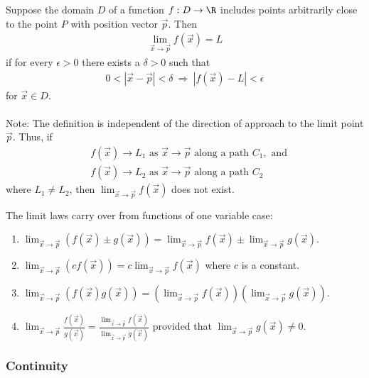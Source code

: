 \documentclass{article}
\begin{document}
\begin{definition}
	Suppose the domain $D$ of a function $f:D\to\R$ includes points
	arbitrarily close to the point $P$ with position vector $\vec p$.
	Then
	\begin{align*}
		\lim_{\vec x\to \vec p}f(\vec x)=L
	\end{align*}
	if for every $\epsilon>0$ there exists a $\delta > 0$ such that
	\begin{align*}
		0 < |\vec x - \vec p| < \delta \:\Rightarrow\: |f(\vec x)-L|<\epsilon
	\end{align*}
	for $\vec x \in D$.\\\\
	Note: The definition is independent of the direction of approach to the
	limit point $\vec p$. Thus, if
	\begin{align*}
		 & f(\vec x)\to L_1 \text{ as } \vec x\to\vec p \text{ along a path } C_1, \text{ and} \\
		 & f(\vec x)\to L_2 \text{ as } \vec x\to\vec p \text{ along a path } C_2
	\end{align*}
	where $L_1 \not= L_2$, then $\lim_{\vec x\to\vec p} f(\vec x)$ does not exist.
\end{definition}
\begin{theorem}
	The limit laws carry over from functions of one variable case:
	\begin{enumerate}
		\item $\lim_{\vec x\to\vec p}\left(f(\vec x)\pm g(\vec x)\right) =
			      \lim_{\vec x\to\vec p}f(\vec x)\pm\lim_{\vec x\to\vec p}g(\vec x)$.
		\item $\lim_{\vec x\to\vec p}\left(cf(\vec x)\right) =
			      c\lim_{\vec x\to\vec p}f(\vec x)$ where $c$ is a constant.
		\item $\lim_{\vec x\to\vec p}\left(f(\vec x)g(\vec x)\right) =
			      \left(\lim_{\vec x\to\vec p}f(\vec x)\right)
			      \left(\lim_{\vec x\to\vec p}g(\vec x)\right)$.
		\item $\lim_{\vec x\to\vec p}\frac{f(\vec x)}{g(\vec x)}
			      =\frac{\lim_{\vec x\to\vec p}f(\vec x)}{\lim_{\vec x\to\vec p}g(\vec x)}$
		      provided that $\lim_{\vec x\to\vec p}g(\vec x)\not=0$.
	\end{enumerate}
\end{theorem}

\subsubsection{Continuity}
\end{document}

